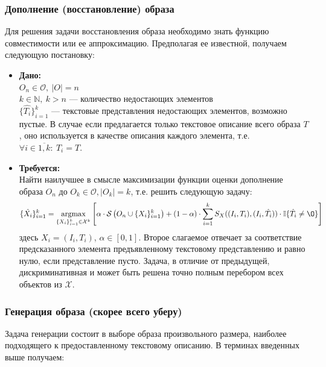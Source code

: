 \documentclass[a4paper,12pt]{article}
\DeclareMathOperator*{\argmax}{argmax}
\begin{document}
			\subsubsection{Дополнение (восстановление) образа}
				Для решения задачи восстановления образа необходимо знать функцию совместимости или ее аппроксимацию. Предполагая ее известной, получаем следующую постановку:
				\begin{itemize}
					\item \textbf{Дано:}\\
					$O_n\in\mathcal{O}, ~|O| = n$ \\
					$k \in \mathbb{N}, ~k> n$ --- количество недостающих элементов\\
					$\{\hat{T_i}\}_{i=1}^k$ --- текстовые представления недостающих элементов, возможно пустые. В случае если предлагается только текстовое описание всего образа $T$, оно используется в качестве описания каждого элемента, т.е. $\forall i \in \overline{1,k}: ~T_i = T$.
					
					\item \textbf{Требуется:}\\
					Найти наилучшее в смысле максимизации функции оценки дополнение образа $O_n$ до $O_k\in\mathcal{O}, |O_k|=k$, т.е. решить следующую задачу:
					$$\{\hat{X_i}\}_{i=1}^k= \argmax_{\{X_i\}_{i=1}^k\in \mathcal{X}^k} \left[\alpha \cdot \mathcal{S}\left(O_n\cup\{X_i\}_{i=1}^k\right) + (1-\alpha) \cdot \sum\limits_{i=1}^k S_X((I_i, T_i), (I_i, \hat{T_i}))\cdot\mathbb{I}\{\hat{T_i}\neq\O\}  \right]$$				
					здесь $X_i = (I_i, T_i)$, $\alpha\in[0,1]$. Второе слагаемое отвечает за соответствие предсказанного элемента предъявленному текстовому представлению и равно нулю, если представление пусто. Задача, в отличие от предыдущей, дискриминативная и  может быть решена точно полным перебором всех объектов из $\mathcal{X}$.
				\end{itemize}
			
			\subsubsection{Генерация образа (скорее всего уберу)}
				Задача генерации состоит в выборе образа произвольного размера, наиболее подходящего к предоставленному текстовому описанию. В терминах введенных выше получаем:
			
\end{document}
